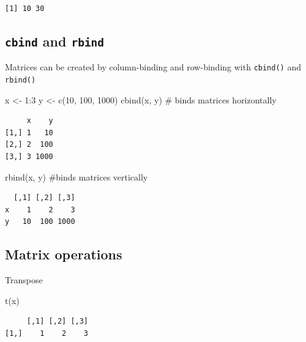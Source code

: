 \documentclass[
  letterpaper,
  DIV=11,
  numbers=noendperiod]{scrreprt}
\newenvironment{Shaded}{\begin{snugshade}}{\end{snugshade}}
\newcommand{\CommentTok}[1]{\textcolor[rgb]{0.37,0.37,0.37}{#1}}
\newcommand{\DecValTok}[1]{\textcolor[rgb]{0.68,0.00,0.00}{#1}}
\newcommand{\FunctionTok}[1]{\textcolor[rgb]{0.28,0.35,0.67}{#1}}
\newcommand{\NormalTok}[1]{\textcolor[rgb]{0.00,0.23,0.31}{#1}}
\newcommand{\OtherTok}[1]{\textcolor[rgb]{0.00,0.23,0.31}{#1}}
\newcommand{\SpecialCharTok}[1]{\textcolor[rgb]{0.37,0.37,0.37}{#1}}
\begin{document}
\begin{verbatim}
[1] 10 30
\end{verbatim}

\subsection{\texorpdfstring{\texttt{cbind} and
\texttt{rbind}}{cbind and rbind}}\label{cbind-and-rbind}

Matrices can be created by column-binding and row-binding with
\texttt{cbind()} and \texttt{rbind()}

\begin{Shaded}
\begin{Highlighting}[]
\NormalTok{x }\OtherTok{\textless{}{-}} \DecValTok{1}\SpecialCharTok{:}\DecValTok{3}
\NormalTok{y }\OtherTok{\textless{}{-}} \FunctionTok{c}\NormalTok{(}\DecValTok{10}\NormalTok{, }\DecValTok{100}\NormalTok{, }\DecValTok{1000}\NormalTok{)}
\FunctionTok{cbind}\NormalTok{(x, y) }\CommentTok{\# binds matrices horizontally}
\end{Highlighting}
\end{Shaded}

\begin{verbatim}
     x    y
[1,] 1   10
[2,] 2  100
[3,] 3 1000
\end{verbatim}

\begin{Shaded}
\begin{Highlighting}[]
\FunctionTok{rbind}\NormalTok{(x, y) }\CommentTok{\#binds matrices vertically}
\end{Highlighting}
\end{Shaded}

\begin{verbatim}
  [,1] [,2] [,3]
x    1    2    3
y   10  100 1000
\end{verbatim}

\subsection{Matrix operations}\label{matrix-operations}

Transpose

\begin{Shaded}
\begin{Highlighting}[]
\FunctionTok{t}\NormalTok{(x)}
\end{Highlighting}
\end{Shaded}

\begin{verbatim}
     [,1] [,2] [,3]
[1,]    1    2    3
\end{verbatim}
\end{document}
